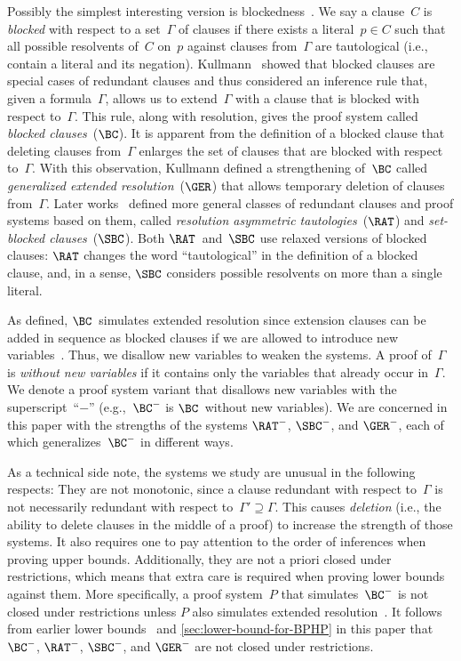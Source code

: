 \documentclass[12pt]{article}
\begin{document}
Possibly the simplest interesting version
is blockedness~\cite{Kul97,Kul99a}.
We say a clause~$C$ is \emph{blocked}
with respect to a set~$\Gamma$ of clauses
if there exists a literal~$p \in C$
such that all possible resolvents of~$C$ on~$p$
against clauses from~$\Gamma$ are tautological
(i.e., contain a literal and its negation).
Kullmann~\cite{Kul99b} showed that blocked clauses are
special cases of redundant clauses
and thus considered an inference rule that,
given a formula~$\Gamma$, allows us to extend~$\Gamma$
with a clause that is blocked with respect to~$\Gamma$.
This rule, along with resolution, gives
the proof system called \emph{blocked clauses}~($\BC$).
It is apparent from the definition of a blocked clause
that deleting clauses from~$\Gamma$ enlarges
the set of clauses that are blocked with respect to~$\Gamma$.
With this observation, Kullmann defined a strengthening of~$\BC$
called \emph{generalized extended resolution}~($\GER$)
that allows temporary deletion of clauses from~$\Gamma$.
Later works~\cite{JHB12,KSTB18} defined
more general classes of redundant clauses
and proof systems based on them,
called \emph{resolution asymmetric tautologies}~($\RAT$)
and \emph{set-blocked clauses}~($\SBC$).
Both $\RAT$~and~$\SBC$ use relaxed versions of blocked clauses:
$\RAT$ changes the word ``tautological'' in the definition of a blocked clause,
and, in a sense, $\SBC$ considers possible resolvents on more than a single literal.

As defined, $\BC$~simulates extended resolution
since extension clauses can be added in sequence as blocked clauses
if we are allowed to introduce new variables~\cite[see][Section~6]{Kul99b}.
Thus, we disallow new variables to weaken the systems.
A proof of~$\Gamma$ is \emph{without new variables}
if it contains only the variables that already occur in~$\Gamma$.
We denote a proof system variant that disallows new variables
with the superscript~``$-$'' (e.g.,~$\BC^-$ is $\BC$~without new variables).
We are concerned in this paper with the strengths of
the systems $\RAT^-$, $\SBC^-$, and $\GER^-$,
each of which generalizes~$\BC^-$ in different ways.

As a technical side note, the systems we study
are unusual in the following respects:
They are not monotonic, since a clause redundant with respect to~$\Gamma$
is not necessarily redundant with respect to~$\Gamma' \supseteq \Gamma$.
This causes \emph{deletion} (i.e., the ability
to delete clauses in the middle of a proof)
to increase the strength of those systems.
It also requires one to pay attention to
the order of inferences when proving upper bounds.
Additionally, they are not a priori closed under restrictions,
which means that extra care is required when proving lower bounds against them.
More specifically, a proof system~$P$ that simulates~$\BC^-$
is not closed under restrictions unless $P$
also simulates extended resolution~\cite[Theorem~2.4]{BT21}.
It follows from earlier lower bounds~\cite{Kul99b,BT21}
and \cref{sec:lower-bound-for-BPHP} in this paper
that $\BC^-$, $\RAT^-$, $\SBC^-$, and $\GER^-$ are not closed under restrictions.
\end{document}
